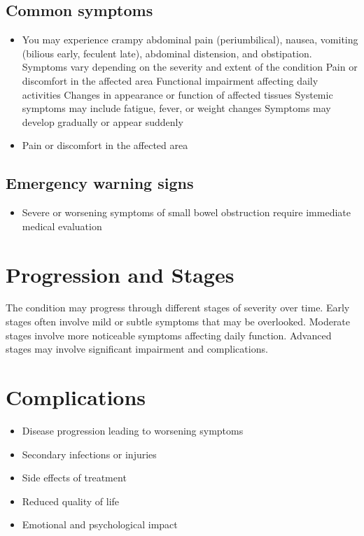 \subsection{Common symptoms}
\begin{itemize}[noitemsep]
  \item You may experience crampy abdominal pain (periumbilical), nausea, vomiting (bilious early, feculent late), abdominal distension, and obstipation. Symptoms vary depending on the severity and extent of the condition Pain or discomfort in the affected area Functional impairment affecting daily activities Changes in appearance or function of affected tissues Systemic symptoms may include fatigue, fever, or weight changes Symptoms may develop gradually or appear suddenly
  \item Pain or discomfort in the affected area
  \end{itemize}

\subsection{Emergency warning signs}
\begin{itemize}[noitemsep]
  \item Severe or worsening symptoms of small bowel obstruction require immediate medical evaluation
\end{itemize}
\section{Progression and Stages}
The condition may progress through different stages of severity over time. Early stages often involve mild or subtle symptoms that may be overlooked. Moderate stages involve more noticeable symptoms affecting daily function. Advanced stages may involve significant impairment and complications.
\section{Complications}
\begin{itemize}[noitemsep]
  \item Disease progression leading to worsening symptoms
  \item Secondary infections or injuries
  \item Side effects of treatment
  \item Reduced quality of life
  \item Emotional and psychological impact
\end{itemize}
